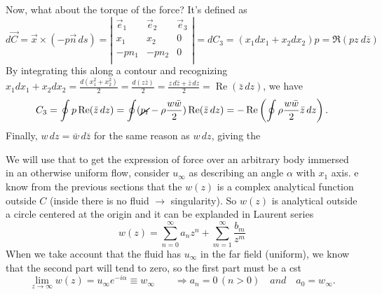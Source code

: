 	\begin{center}
	\end{center}
	Now, what about the torque of the force? It's defined as 
	\begin{equation}
	d\vec{C} = \vec{x} \times (-p\vec{n} \, ds) = \left|
\begin{array}{ccc}
\vec{e}_1 & \vec{e}_2 & \vec{e}_3\\
x_1 & x_2 & 0\\
-pn_1 & -pn_2 & 0 \\
\end{array}
\right|
=dC_3 = \left( x_1 dx_1 + x_2 dx_2\right) p= \Re \left( pz \ d\overline{z} \right)
	\end{equation}
	By integrating this along a contour and recognizing $x_1dx_1+x_2dx_2 = \frac{d(x_1^2+x_2^2)}{2} = \frac{d(z\bar{z})}{2}=\frac{z\, d\bar{z}+\bar{z}\, dz}{2} = \operatorname{Re}(\bar{z}\, dz)$, we have 
	\begin{equation}
		C_3 = \oint p\operatorname{Re}(\bar{z}\, dz) = \oint (\cancel{p_t} - \rho \frac{w\bar{w}}{2})\operatorname{Re}(\bar{z}\, dz) = -\operatorname{Re}\left(\oint \rho \frac{w\bar{w}}{2}\bar{z}\, dz \right).
	\end{equation}
	Finally, $w\, dz = \bar{w}\, d\bar{z}$ for the same reason as $w\,dz$, giving the 
	
	\begin{center}
	\end{center}
	We will use that to get the expression of force over an arbitrary body immersed in an otherwise uniform flow, consider $u_\infty$ as describing an angle $\alpha$ with $x_1$ axis. e know from the previous sections that the $w(z)$ is a complex analytical function outside $C$ (inside there is no fluid $\rightarrow$ singularity). So $w(z)$ is analytical outside a circle centered at the origin and it can be explanded in Laurent series
	\begin{equation}
		w(z) = \sum_{n=0}^\infty a_n z^n + \sum_{m=1}^\infty\frac{b_m}{z^m}
	\end{equation}
	When we take account that the fluid has $u_\infty$ in the far field (uniform), we know that the second part will tend to zero, so the first part must be a cst
	\begin{equation}
		\lim _{z\rightarrow \infty} w(z) = u_\infty e^{-i\alpha} \equiv w_\infty \qquad \Rightarrow a_n = 0 \, (n>0) \quad and \quad a_0 = w_\infty .
	\end{equation}
	
